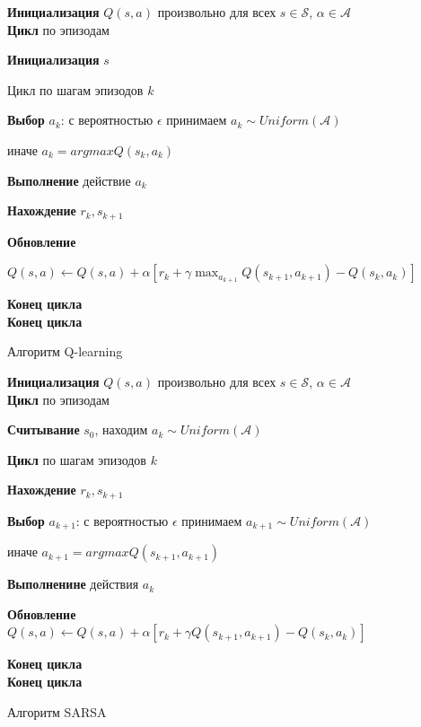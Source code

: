	\begin{figure}[ht!]
		\centering
		\begin{tcolorbox}
\textbf{Инициализация} $Q(s, a)$ произвольно для всех $s \in \mathcal{S}$, $\alpha \in \mathcal{A}$\\
\textbf{Цикл} {по эпизодам}

\textbf{Инициализация} $s$

Цикл {по шагам эпизодов $k$}

\textbf{Выбор} $a_k$: с вероятностью $\epsilon$ принимаем $a_k \sim Uniform(\mathcal{A})$

 иначе $a_k = argmax Q(s_k, a_k)$
			
\textbf{Выполнение} действие $a_k$

\textbf{Нахождение} $r_k, s_{k+1}$

\textbf{Обновление} 

$Q(s,a ) \leftarrow Q(s, a) + \alpha [r_k + \gamma \max_{a_{k+1}}Q(s_{k+1}, a_{k+1})-Q(s_k,a_k)]$

\textbf{Конец цикла}\\
\textbf{Конец цикла}
		\end{tcolorbox}
		\caption{Алгоритм Q-learning}
		\label{fig:q_learn-ch1}
\end{figure}
%
\begin{figure}[!ht]
		\centering
		\begin{tcolorbox}%
\textbf{Инициализация} $Q(s, a)$ произвольно для всех $s \in \mathcal{S}$, $\alpha \in \mathcal{A}$\\
\textbf{Цикл} {по эпизодам}

\textbf{Считывание} $s_0$, находим $a_k \sim Uniform(\mathcal{A})$

\textbf{Цикл} {по шагам эпизодов $k$}

\textbf{Нахождение} $r_k, s_{k+1}$

\textbf{Выбор} $a_{k+1}$: с вероятностью $\epsilon$ принимаем $a_{k+1} \sim Uniform(\mathcal{A})$

иначе $a_{k+1} = argmax Q(s_{k+1}, a_{k+1})$
			
\textbf{Выполненине} действия $a_k$
			
\textbf{Обновление} 
$Q(s,a ) \leftarrow Q(s, a) + \alpha [r_k + \gamma Q(s_{k+1}, a_{k+1})-Q(s_k,a_k)]$

\textbf{Конец цикла}\\
\textbf{Конец цикла}
		\end{tcolorbox}
		\caption{Алгоритм SARSA}
		\label{fig:sarsa-ch1}
	\end{figure}

